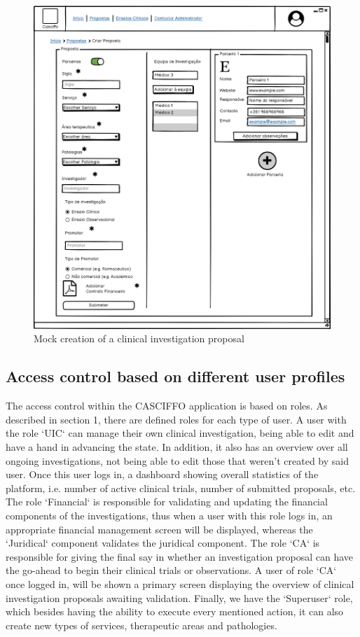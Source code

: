 \begin{figure}[H]
    \centering
    \includegraphics[scale=0.35]{images/criar-proposta.png}
    \caption{Mock creation of a clinical investigation proposal}
    \label{fig:criar-proposta}
\end{figure}

\subsection{Access control based on different user profiles}
\label{subsec:access-control-based-user-profiles}
The access control within the CASCIFFO application is based on roles.
As described in section 1, there are defined roles for each type of user.  
A user with the role `UIC` can manage their own clinical investigation, being able to edit and have a hand in advancing the state. In addition, it also has an overview over all ongoing investigations, not being able to edit those that weren't created by said user. Once this user logs in, a dashboard showing overall statistics of the platform, i.e. number of active clinical trials, number of submitted proposals, etc.
The role `Financial` is responsible for validating and updating the financial components of the investigations, thus when a user with this role logs in, an appropriate financial management screen will be displayed, whereas the `Juridical` component validates the juridical component.  
The role `CA` is responsible for giving the final say in whether an investigation proposal can have the go-ahead to begin their clinical trials or observations.  
A user of role `CA` once logged in, will be shown a primary screen displaying the overview of clinical investigation proposals awaiting validation.
Finally, we have the `Superuser` role, which besides having the ability to execute every mentioned action, it can also create new types of services, therapeutic areas and pathologies.


